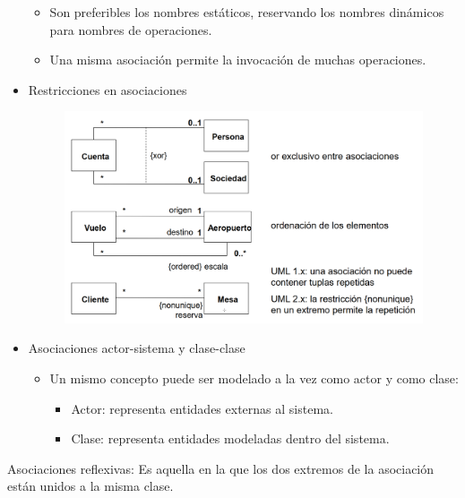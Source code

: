 \documentclass[12pt, twoside, openright]{report} %
\begin{document}
\begin{itemize}
\begin{itemize}
      \item
        Son preferibles los nombres estáticos, reservando los nombres
        dinámicos para nombres de operaciones.
      \item
        Una misma asociación permite la invocación de muchas
        operaciones.
      \end{itemize}
    \item
      Restricciones en asociaciones
	  \begin{figure}[H]
		{\includegraphics[scale=.23]{Untitled 20.png}}
	\end{figure}
    \item
      Asociaciones actor-sistema y clase-clase

      \begin{itemize}
      
      \item
        Un mismo concepto puede ser modelado a la vez como actor y como
        clase:

        \begin{itemize}
        
        \item
          Actor: representa entidades externas al sistema.
        \item
          Clase: representa entidades modeladas dentro del sistema.
        \end{itemize}
      \end{itemize}
    \end{itemize}

	Asociaciones reflexivas: Es aquella en la que los dos extremos de la
    asociación están unidos a la misma clase.
\end{document}
